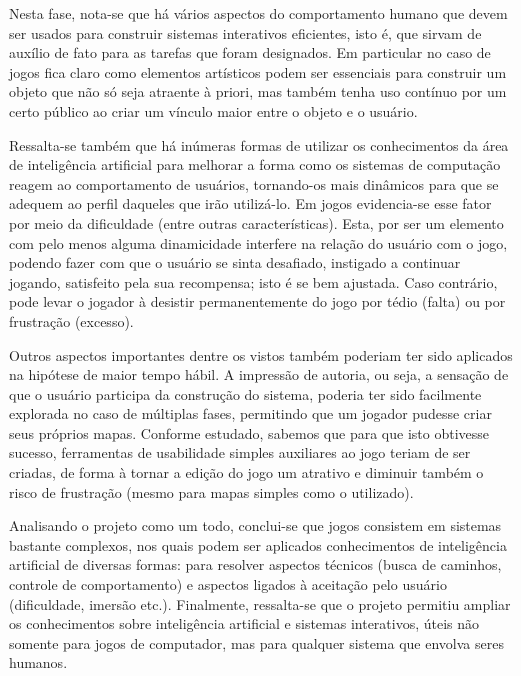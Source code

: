 \documentclass[a4paper]{scrartcl}
\begin{document}
Nesta fase, nota-se que há vários aspectos do comportamento humano que devem ser
usados para construir sistemas interativos eficientes, isto é, que sirvam de auxílio de fato
para as tarefas que foram designados. Em particular no caso de jogos fica claro como elementos
artísticos podem ser essenciais para construir um objeto que não só seja atraente à priori, mas
também tenha uso contínuo por um certo público ao criar um vínculo maior entre o objeto e o usuário.

Ressalta-se também que há inúmeras formas de utilizar os conhecimentos da área de inteligência artificial para melhorar a forma como os sistemas de computação reagem ao comportamento de 
usuários, tornando-os mais dinâmicos para que se adequem ao perfil daqueles que irão utilizá-lo.
Em jogos evidencia-se esse fator por meio da dificuldade (entre outras características). Esta, por
ser um elemento com pelo menos alguma dinamicidade interfere na relação do usuário com o jogo,
podendo fazer com que o usuário se sinta desafiado, instigado a continuar jogando, satisfeito
pela sua recompensa; isto é se bem ajustada. Caso contrário, pode levar o jogador à desistir
permanentemente do jogo por tédio (falta) ou por frustração (excesso).

Outros aspectos importantes dentre os vistos também poderiam ter sido aplicados na hipótese de maior tempo hábil.
A impressão de autoria, ou seja, a sensação de que o usuário participa da construção do sistema, poderia ter sido facilmente
explorada no caso de múltiplas fases, permitindo que um jogador pudesse criar seus próprios mapas. 
Conforme estudado, sabemos que para que isto obtivesse sucesso, ferramentas de usabilidade simples auxiliares ao jogo teriam
de ser criadas, de forma à tornar a edição do jogo um atrativo e diminuir também o risco de frustração (mesmo para mapas simples como o utilizado).

Analisando o projeto como um todo, conclui-se que jogos consistem em sistemas bastante complexos, nos quais podem ser aplicados conhecimentos
de inteligência artificial de diversas formas: para resolver aspectos técnicos (busca de caminhos, controle de comportamento) e aspectos ligados à
aceitação pelo usuário (dificuldade, imersão etc.). Finalmente, ressalta-se que o projeto permitiu ampliar os conhecimentos sobre inteligência artificial
e sistemas interativos, úteis não somente para jogos de computador, mas para qualquer sistema que envolva seres humanos.
\end{document}
